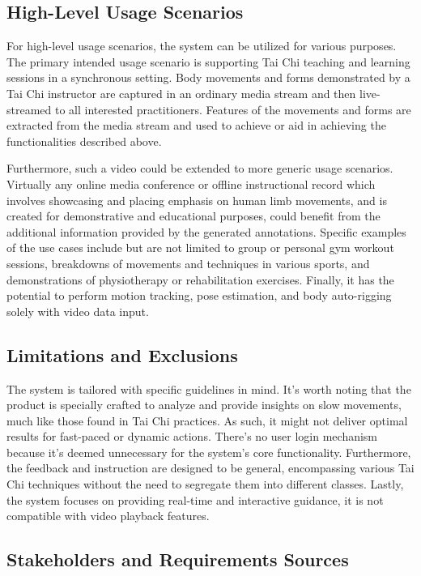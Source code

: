 \documentclass[12pt]{article}
\begin{document}
\subsection{High-Level Usage Scenarios}
For high-level usage scenarios, the system can be utilized for various purposes. The primary intended usage scenario is supporting Tai Chi teaching and learning sessions in a synchronous setting. Body movements and forms demonstrated by a Tai Chi instructor are captured in an ordinary media stream and then live-streamed to all interested practitioners. Features of the movements and forms are extracted from the media stream and used to achieve or aid in achieving the functionalities described above.

Furthermore, such a video could be extended to more generic usage scenarios. Virtually any online media conference or offline instructional record which involves showcasing and placing emphasis on human limb movements, and is created for demonstrative and educational purposes, could benefit from the additional information provided by the generated annotations. Specific examples of the use cases include but are not limited to group or personal gym workout sessions, breakdowns of movements and techniques in various sports, and demonstrations of physiotherapy or rehabilitation exercises. Finally, it has the potential to perform motion tracking, pose estimation, and body auto-rigging solely with video data input.

\subsection{Limitations and Exclusions}
The system is tailored with specific guidelines in mind. It's worth noting that the product is specially crafted to analyze and provide insights on slow movements, much like those found in Tai Chi practices. As such, it might not deliver optimal results for fast-paced or dynamic actions. There's no user login mechanism because it's deemed unnecessary for the system's core functionality. Furthermore, the feedback and instruction are designed to be general, encompassing various Tai Chi techniques without the need to segregate them into different classes. Lastly, the system focuses on providing real-time and interactive guidance, it is not compatible with video playback features.

\subsection{Stakeholders and Requirements Sources}
\end{document}
